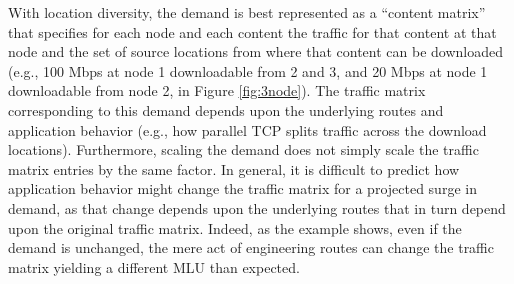 With location diversity, the demand is best represented as a ``content matrix'' that specifies for each node and each content the traffic for that content at that node and the set of source locations from where that content can be downloaded (e.g., 100 Mbps at node 1 downloadable from 2 and 3, and 20 Mbps at node 1 downloadable from node 2, in Figure \ref{fig:3node}). The traffic matrix corresponding to this demand depends upon the underlying routes and application behavior (e.g., how parallel TCP splits traffic across the download locations). Furthermore, scaling the demand does not simply scale the traffic matrix entries by the same factor. In general, it is difficult to predict how application behavior might change the traffic matrix for a projected surge in demand, as that change depends upon the underlying routes that in turn depend upon the original traffic matrix. Indeed, as the example shows, even if the demand is unchanged, the mere act of engineering routes can change the traffic matrix yielding a different MLU than expected.





